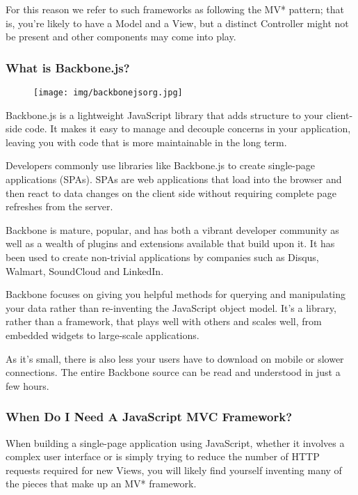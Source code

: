 \documentclass[9pt]{book}
\begin{document}
For this reason we refer to such frameworks as following the MV*
pattern; that is, you're likely to have a Model and a View, but a
distinct Controller might not be present and other components may come
into play.

\subsubsection{What is Backbone.js?}\label{what-is-backbone.js}

\begin{figure}[htbp]
\centering
\texttt{[image: img/backbonejsorg.jpg]}
\end{figure}

Backbone.js is a lightweight JavaScript library that adds structure to
your client-side code. It makes it easy to manage and decouple concerns
in your application, leaving you with code that is more maintainable in
the long term.

Developers commonly use libraries like Backbone.js to create single-page
applications (SPAs). SPAs are web applications that load into the
browser and then react to data changes on the client side without
requiring complete page refreshes from the server.

Backbone is mature, popular, and has both a vibrant developer community
as well as a wealth of plugins and extensions available that build upon
it. It has been used to create non-trivial applications by companies
such as Disqus, Walmart, SoundCloud and LinkedIn.

Backbone focuses on giving you helpful methods for querying and
manipulating your data rather than re-inventing the JavaScript object
model. It's a library, rather than a framework, that plays well with
others and scales well, from embedded widgets to large-scale
applications.

As it's small, there is also less your users have to download on mobile
or slower connections. The entire Backbone source can be read and
understood in just a few hours.

\subsubsection{When Do I Need A JavaScript MVC
Framework?}\label{when-do-i-need-a-javascript-mvc-framework}

When building a single-page application using JavaScript, whether it
involves a complex user interface or is simply trying to reduce the
number of HTTP requests required for new Views, you will likely find
yourself inventing many of the pieces that make up an MV* framework.
\end{document}
